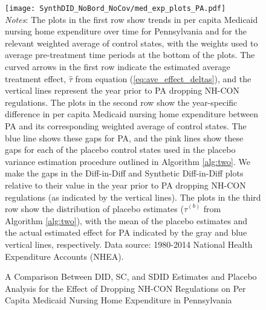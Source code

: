 \documentclass[../Main.tex]{subfiles}
\begin{document}
\newpage
{}
\begin{figure}[t] 
    \setlength{}
	\caption{\label{fig:med_exp_plots_pa} \centering A Comparison Between DID, SC, and SDID Estimates and Placebo Analysis for the Effect of Dropping NH-CON Regulations on Per Capita Medicaid Nursing Home Expenditure in Pennsylvania} {\centering\texttt{[image: SynthDID\_NoBord\_NoCov/med\_exp\_plots\_PA.pdf]}}
    \vspace{-1.4cm}\\
    \scriptsize
		\textit{Notes}: The plots in the first row show trends in per capita Medicaid nursing home expenditure over time for Pennsylvania and for the relevant weighted average of control states, with the weights used to average pre-treatment time periods at the bottom of the plots. The curved arrows in the first row indicate the estimated average treatment effect, $\hat{\tau}$ from equation (\ref{eq:ave_effect_deltas}), and the vertical lines represent the year prior to PA dropping NH-CON regulations. The plots in the second row show the year-specific difference in per capita Medicaid nursing home expenditure between PA and its corresponding weighted average of control states. The blue line shows these gaps for PA, and the pink lines show these gaps for each of the placebo control states used in the placebo variance estimation procedure outlined in Algorithm \ref{alg:two}. We make the gaps in the Diff-in-Diff and Synthetic Diff-in-Diff plots relative to their value in the year prior to PA dropping NH-CON regulations (as indicated by the vertical lines). The plots in the third row show the distribution of placebo estimates ($\hat{\tau}^{(b)}$ from Algorithm \ref{alg:two}), with the mean of the placebo estimates and the actual estimated effect for PA indicated by the gray and blue vertical lines, respectively. Data source: 1980-2014 National Health Expenditure Accounts (NHEA).
\end{figure}
\restoregeometry
\clearpage
\end{document}
